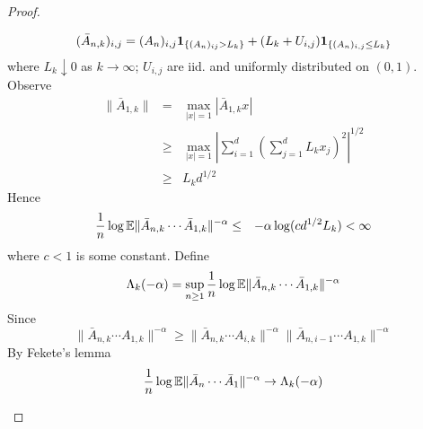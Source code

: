 \documentclass{article}
\theoremstyle{remark}
\begin{document}
\begin{proof}
\begin{enumerate}
    \begin{equation*}
      (\bar A_{n,k})_{i,j} = (A_n)_{i,j}\mathbf{1}_{\{(A_n)_{ij} > L_k\}} +
      (L_k + U_{i,j})\mathbf{1}_{\{(A_n)_{i,j} \leq L_k\}}
    \end{equation*}
    where $L_k \downarrow 0$ as $k \to \infty$; $U_{i,j}$ are
    iid. and uniformly distributed on $(0,1)$. 
    Observe
    \begin{eqnarray*}
      \|\bar A_{1,k}\|
      &=&
      \max_{|x| = 1} |\bar A_{1,k} x| \\
      &\geq&
      \max_{|x| = 1}
      \left|
        \sum_{i=1}^d \left(\sum_{j=1}^d L_k x_j \right)^2
      \right|^{1/2} \\
      &\geq& L_k d^{1/2}
    \end{eqnarray*}
    Hence
    \begin{eqnarray*}
      {1 \over n} \log \mathbb{E} \|\bar A_{n,k} \cdots \bar A_{1,k}\|^{-\alpha}
      &\leq&
      -\alpha \log(c d^{1/2} L_k) < \infty
    \end{eqnarray*}
    where $c < 1$ is some constant.
    Define
    \begin{equation*}
      \Lambda_{k}(-\alpha) = \sup_{n \geq 1} {1 \over n} \log
      \mathbb{E}\|\bar A_{n,k} \cdots \bar A_{1,k}\|^{-\alpha}
    \end{equation*}
    Since
    \begin{equation*}
      \|\bar A_{n,k} \cdots A_{1,k}\|^{-\alpha}
      \geq
      \|\bar A_{n,k} \cdots A_{i,k}\|^{-\alpha}
      \|\bar A_{n,i-1} \cdots A_{1,k}\|^{-\alpha}
    \end{equation*}
    By Fekete's lemma
    \begin{equation*}
      {1 \over n} \log \mathbb{E} \|\bar A_{n} \cdots \bar A_{1}\|^{-\alpha}
      \to
      \Lambda_{k}(-\alpha)
    \end{equation*}
    \end{enumerate}
\end{proof}




\end{document}
